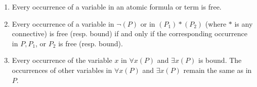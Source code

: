 \begin{enumerate}
\item[(a)] Every occurrence of a variable in an atomic formula or term is free.
\item[(b)] Every occurrence of a variable in $\neg(P)$ or in $(P_1) * (P_2)$ (where $*$ is any connective) is free (resp. bound) if and only if the corresponding occurrence in $P, P_1$, or $P_2$ is free (resp. bound).
\item[(c)] Every occurrence of the variable $x$ in $\forall x(P)$ and $\exists x(P)$ is bound. The occurrences of other variables in $\forall x(P)$ and $\exists x(P)$ remain the same as in $P$.
\end{enumerate}
